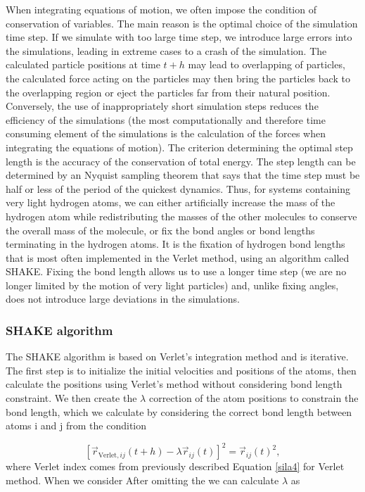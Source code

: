 When integrating equations of motion, we often impose the condition of conservation of variables. The main reason is the optimal choice of the simulation time step. If we simulate with too large time step, we introduce large errors into the simulations, leading in extreme cases to a crash of the simulation. The calculated particle positions at time $t+h$ may lead to overlapping of particles, the calculated force acting on the particles may then bring the particles back to the overlapping region or eject the particles far from their natural position. Conversely, the use of inappropriately short simulation steps reduces the efficiency of the simulations (the most computationally and therefore time consuming element of the simulations is the calculation of the forces when integrating the equations of motion). The criterion determining the optimal step length is the accuracy of the conservation of total energy. The step length can be determined by an Nyquist sampling theorem that says that the time step must be half or less of the period of the quickest dynamics. Thus, for systems containing very light hydrogen atoms, we can either artificially increase the mass of the hydrogen atom while redistributing the masses of the other molecules to conserve the overall mass of the molecule, or fix the bond angles or bond lengths terminating in the hydrogen atoms. It is the fixation of hydrogen bond lengths that is most often implemented in the Verlet method, using an algorithm called SHAKE. Fixing the bond length allows us to use a longer time step (we are no longer limited by the motion of very light particles) and, unlike fixing angles, does not introduce large deviations in the simulations.

\subsubsection{SHAKE algorithm}

The SHAKE algorithm is based on Verlet's integration method and is iterative. The first step is to initialize the initial velocities and positions of the atoms, then calculate the positions using Verlet's method without considering bond length constraint. We then create the $\lambda$ correction of the atom positions to constrain the bond length, which we calculate by considering the correct bond length between atoms i and j from the condition 

\begin{equation}\label{SHAKE}
	[\vec{r}_{\text{Verlet},ij}(t + h)-\lambda\vec{r}_{ij}(t)]^2 = \vec{r}_{ij}(t)^2,
\end{equation}
where Verlet index comes from previously described Equation \ref{sila4} for Verlet method. When we consider After omitting the we can calculate $\lambda$ as

